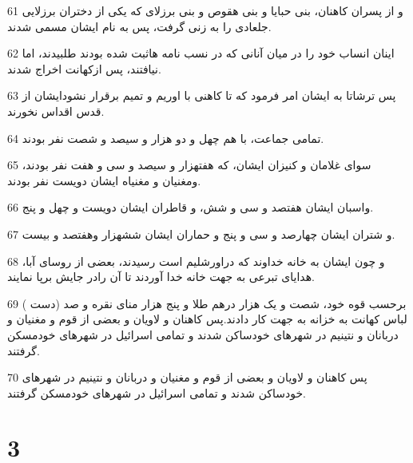 \par 61 و از پسران کاهنان، بنی حبایا و بنی هقوص و بنی برزلای که یکی از دختران برزلایی جلعادی را به زنی گرفت، پس به نام ایشان مسمی شدند.
\par 62 اینان انساب خود را در میان آنانی که در نسب نامه هاثبت شده بودند طلبیدند، اما نیافتند، پس ازکهانت اخراج شدند.
\par 63 پس ترشاتا به ایشان امر فرمود که تا کاهنی با اوریم و تمیم برقرار نشودایشان از قدس اقداس نخورند.
\par 64 تمامی جماعت، با هم چهل و دو هزار و سیصد و شصت نفر بودند.
\par 65 سوای غلامان و کنیزان ایشان، که هفتهزار و سیصد و سی و هفت نفر بودند، ومغنیان و مغنیاه ایشان دویست نفر بودند.
\par 66 واسبان ایشان هفتصد و سی و شش، و قاطران ایشان دویست و چهل و پنج.
\par 67 و شتران ایشان چهارصد و سی و پنج و حماران ایشان ششهزار وهفتصد و بیست.
\par 68 و چون ایشان به خانه خداوند که دراورشلیم است رسیدند، بعضی از روسای آبا، هدایای تبرعی به جهت خانه خدا آوردند تا آن رادر جایش برپا نمایند.
\par 69 برحسب قوه خود، شصت و یک هزار درهم طلا و پنج هزار منای نقره و صد (دست ) لباس کهانت به خزانه به جهت کار دادند.پس کاهنان و لاویان و بعضی از قوم و مغنیان و دربانان و نتینیم در شهرهای خودساکن شدند و تمامی اسرائیل در شهرهای خودمسکن گرفتند.
\par 70 پس کاهنان و لاویان و بعضی از قوم و مغنیان و دربانان و نتینیم در شهرهای خودساکن شدند و تمامی اسرائیل در شهرهای خودمسکن گرفتند.
 
\chapter{3}

